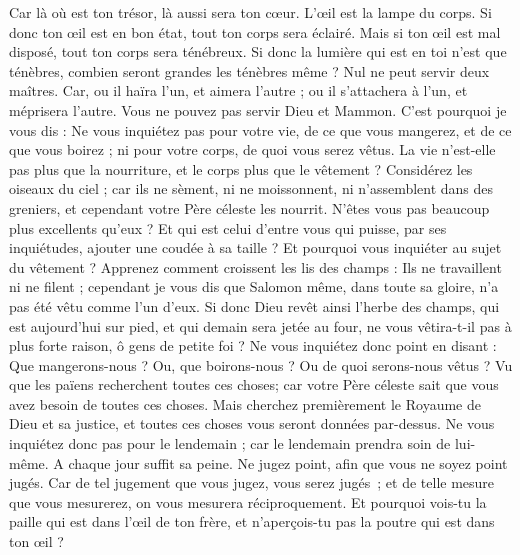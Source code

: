 \begin{multicols}{2}
Car là où est ton trésor, là aussi sera ton cœur.
L’œil est la lampe du corps. Si donc ton œil est en bon état, tout ton corps sera éclairé.
Mais si ton œil est mal disposé, tout ton corps sera ténébreux. Si donc la lumière qui est en toi n'est que ténèbres, combien seront grandes les ténèbres même ?
Nul ne peut servir deux maîtres. Car, ou il haïra l'un, et aimera l'autre ; ou il s'attachera à l'un, et méprisera l'autre. Vous ne pouvez pas servir Dieu et Mammon.
C'est pourquoi je vous dis : Ne vous inquiétez pas pour votre vie, de ce que vous mangerez, et de ce que vous boirez ; ni pour votre corps, de quoi vous serez vêtus. La vie n'est-elle pas plus que la nourriture, et le corps plus que le vêtement ?
Considérez les oiseaux du ciel ; car ils ne sèment, ni ne moissonnent, ni n'assemblent dans des greniers, et cependant votre Père céleste les nourrit. N'êtes vous pas beaucoup plus excellents qu'eux ?
Et qui est celui d'entre vous qui puisse, par ses inquiétudes, ajouter une coudée à sa taille ?
Et pourquoi vous inquiéter au sujet du vêtement ? Apprenez comment croissent les lis des champs : Ils ne travaillent ni ne filent ;
cependant je vous dis que Salomon même, dans toute sa gloire, n'a pas été vêtu comme l'un d'eux.
Si donc Dieu revêt ainsi l'herbe des champs, qui est aujourd'hui sur pied, et qui demain sera jetée au four, ne vous vêtira-t-il pas à plus forte raison, ô gens de petite foi ?
Ne vous inquiétez donc point en disant : Que mangerons-nous ? Ou, que boirons-nous ? Ou de quoi serons-nous vêtus ?
Vu que les païens recherchent toutes ces choses; car votre Père céleste sait que vous avez besoin de toutes ces choses.
Mais cherchez premièrement le Royaume de Dieu et sa justice, et toutes ces choses vous seront données par-dessus.
Ne vous inquiétez donc pas pour le lendemain ; car le lendemain prendra soin de lui-même. A chaque jour suffit sa peine.
\VerseOne{}Ne jugez point, afin que vous ne soyez point jugés.
Car de tel jugement que vous jugez, vous serez jugés ; et de telle mesure que vous mesurerez, on vous mesurera réciproquement.
Et pourquoi vois-tu la paille qui est dans l’œil de ton frère, et n’aperçois-tu pas la poutre qui est dans ton œil ?

\end{multicols}
